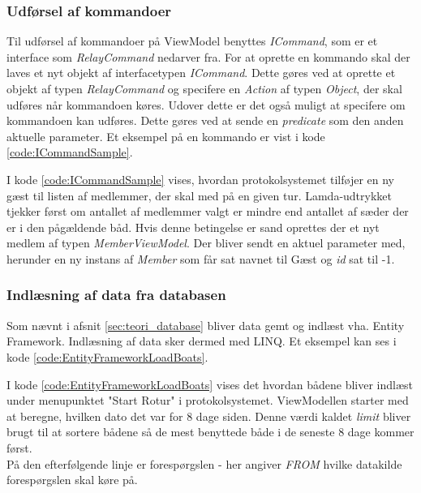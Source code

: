 \subsubsection*{Udførsel af kommandoer}
Til udførsel af kommandoer på ViewModel benyttes \textit{ICommand}, som er et interface som \textit{RelayCommand} nedarver fra. For at oprette en kommando skal der laves et nyt objekt af interfacetypen \textit{ICommand}. Dette gøres ved at oprette et objekt af typen \textit{RelayCommand} og specifere en \textit{Action} af typen \textit{Object}, der skal udføres når kommandoen køres. Udover dette er det også muligt at specifere om kommandoen kan udføres. Dette gøres ved at sende en \textit{predicate} som den anden aktuelle parameter. Et eksempel på en kommando er vist i kode \ref{code:ICommandSample}.


I kode \ref{code:ICommandSample} vises, hvordan protokolsystemet tilføjer en ny gæst til listen af medlemmer, der skal med på en given tur. Lamda-udtrykket tjekker først om antallet af medlemmer valgt er mindre end antallet af sæder der er i den pågældende båd. Hvis denne betingelse er sand oprettes der et nyt medlem af typen \textit{MemberViewModel}. Der bliver sendt en aktuel parameter med, herunder en ny instans af \textit{Member} som får sat navnet til Gæst og \textit{id} sat til -1.

\subsubsection*{Indlæsning af data fra databasen}
Som nævnt i afsnit \ref{sec:teori_database} bliver data gemt og indlæst vha. Entity Framework. Indlæsning af data sker dermed med LINQ. Et eksempel kan ses i kode \ref{code:EntityFrameworkLoadBoats}.


I kode \ref{code:EntityFrameworkLoadBoats} vises det hvordan bådene bliver indlæst under menupunktet "Start Rotur"\mbox{} i protokolsystemet. ViewModellen starter med at beregne, hvilken dato det var for 8 dage siden. Denne værdi kaldet \textit{limit} bliver brugt til at sortere bådene så de mest benyttede både i de seneste 8 dage kommer først.\\

På den efterfølgende linje er forespørgslen - her angiver \textit{FROM} hvilke datakilde forespørgslen skal køre på.\\

